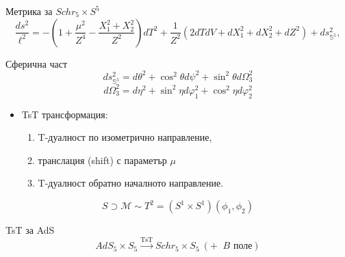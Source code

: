 \documentclass[bulg]{beamer}
\begin{document}
  \begin{frame}{}
  \begin{alertblock}{Метрика за $Schr_5\times S^5$}
      \vspace{-0.2cm}
  \begin{equation*}
    \frac{ds^2}{\ell^2} = -\left(1+\frac{\mu^2}{Z^4} - \frac{X_1^2+X_2^2}{Z^2}\right)d T^2
    + \frac{1}{Z^2}\left(2d
    Td V + d X_1^2 + d X_2^2 + d Z^2\right) + d s^2_{\mathbb{S}^5}
  ,
  \end{equation*}
  \end{alertblock}

  \begin{minipage}[t]{0.5\linewidth}%
    \begin{exampleblock}{Сферична част}
      \vspace{-0.5cm}
    \begin{equation*}
      ds^2_{\mathbb{S}^5} = d\theta^2 + \cos^2\theta d\psi^2
      + \sin^2\theta d\Omega^2_3
    \end{equation*}
    \begin{equation*}
     d \Omega^2_3 = d \eta^2 + \sin^2\eta d \varphi_1^2 + \cos^2\eta d\varphi^2_2
    \end{equation*}
    \end{exampleblock}
  \end{minipage}%
  \begin{minipage}[t]{0.5\linewidth}%
  \vspace{0.25cm}
  \begin{itemize}
    \item \alert{TsT} трансформация:
      \begin{enumerate}
        \item \alert{T}-дуалност по изометрично направление,
        \item транслация (\alert{s}hift) с параметър $\mu$
        \item \alert{T}-дуалност обратно началното направление.
      \end{enumerate}
  \end{itemize}
  \end{minipage}%
  \begin{equation*}
    S \supset \mathcal{M}\sim T^2 = (S^1\times S^1) (\phi_1,\phi_2)
  \end{equation*}
  \vspace{-0.5cm}
  \begin{alertblock}{TsT за AdS}
  \begin{equation*}
    AdS_5\times S_5 \xrightarrow{\text{TsT}} Schr_5\times S_5\ (+\ \text{
    $B$ поле})
  \end{equation*}
  \end{alertblock}
  \end{frame}
\end{document}
